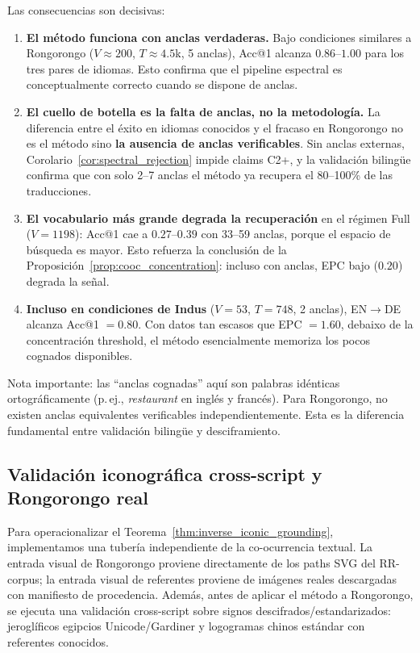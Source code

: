 \documentclass[11pt,a4paper]{article}
\newcommand{\1}{\mathbf{1}}
\numberwithin{equation}{section}
\begin{document}
Las consecuencias son decisivas:

\begin{enumerate}[label=(\roman*)]
    \item \textbf{El método funciona con anclas verdaderas.} Bajo condiciones similares a Rongorongo ($V \approx 200$, $T \approx 4.5$k, 5 anclas), Acc@1 alcanza $0.86$--$1.00$ para los tres pares de idiomas. Esto confirma que el pipeline espectral es conceptualmente correcto cuando se dispone de anclas.

    \item \textbf{El cuello de botella es la falta de anclas, no la metodología.} La diferencia entre el éxito en idiomas conocidos y el fracaso en Rongorongo no es el método sino \textbf{la ausencia de anclas verificables}. Sin anclas externas, Corolario~\ref{cor:spectral_rejection} impide claims C2+, y la validación bilingüe confirma que con solo 2--7 anclas el método ya recupera el 80--100\% de las traducciones.

    \item \textbf{El vocabulario más grande degrada la recuperación} en el régimen Full ($V\!=\!1198$): Acc@1 cae a $0.27$--$0.39$ con 33--59 anclas, porque el espacio de búsqueda es mayor. Esto refuerza la conclusión de la Proposición~\ref{prop:cooc_concentration}: incluso con anclas, EPC bajo ($0.20$) degrada la señal.

    \item \textbf{Incluso en condiciones de Indus} ($V\!=\!53$, $T\!=\!748$, 2 anclas), EN$\to$DE alcanza Acc@1 $= 0.80$. Con datos tan escasos que EPC $= 1.60$, debaixo de la concentración threshold, el método esencialmente memoriza los pocos cognados disponibles.
\end{enumerate}

Nota importante: las ``anclas cognadas'' aquí son palabras idénticas ortográficamente (p.\,ej., \emph{restaurant} en inglés y francés). Para Rongorongo, no existen anclas equivalentes verificables independientemente. Esta es la diferencia fundamental entre validación bilingüe y desciframiento.

\subsection{Validación iconográfica cross-script y Rongorongo real}
\label{sec:iconic_results}

Para operacionalizar el Teorema~\ref{thm:inverse_iconic_grounding}, implementamos una tubería independiente de la co-ocurrencia textual. La entrada visual de Rongorongo proviene directamente de los paths SVG del RR-corpus; la entrada visual de referentes proviene de imágenes reales descargadas con manifiesto de procedencia. Además, antes de aplicar el método a Rongorongo, se ejecuta una validación cross-script sobre signos descifrados/estandarizados: jeroglíficos egipcios Unicode/Gardiner y logogramas chinos estándar con referentes conocidos.
\end{document}
